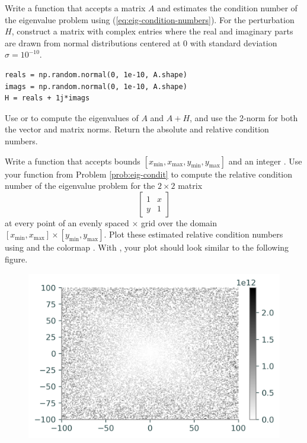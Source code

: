 \begin{problem}\label{prob:eigenvalue} %
Write a function that accepts a matrix $A$ and estimates the condition number of the eigenvalue problem using (\ref{eq:eig-condition-numbers}).
For the perturbation $H$, construct a matrix with complex entries where the real and imaginary parts are drawn from normal distributions centered at $0$ with standard deviation $\sigma = 10^{-10}$.
\begin{lstlisting}
reals = np.random.normal(0, 1e-10, A.shape)
imags = np.random.normal(0, 1e-10, A.shape)
H = reals + 1j*imags
\end{lstlisting}
Use  or  to compute the eigenvalues of $A$ and $A+H$, and use the 2-norm for both the vector and matrix norms.
Return the absolute and relative condition numbers.
\label{prob:eig-condit}
\end{problem}

\begin{problem}
Write a function that accepts bounds $[x_{\min},x_{\max},y_{\min},y_{\max}]$ and an integer .
Use your function from Problem \ref{prob:eig-condit} to compute the relative condition number of the eigenvalue problem for the $2\times 2$ matrix
\[
\left[\begin{array}{cc}
1 &  x\\
y & 1\end{array}\right]
\]
at every point of an evenly spaced $\times$ grid over the domain $[x_{\min}, x_{\max}]\times [y_{\min}, y_{\max}]$.
Plot these estimated relative condition numbers using  and the colormap .
With , your plot should look similar to the following figure.

\begin{figure}[H]
    \includegraphics[width=.7\linewidth]{figures/eigenvalue_conditioning.png}
\end{figure}

\label{prob:eigenvalue-conditioning-plot}
\end{problem}


